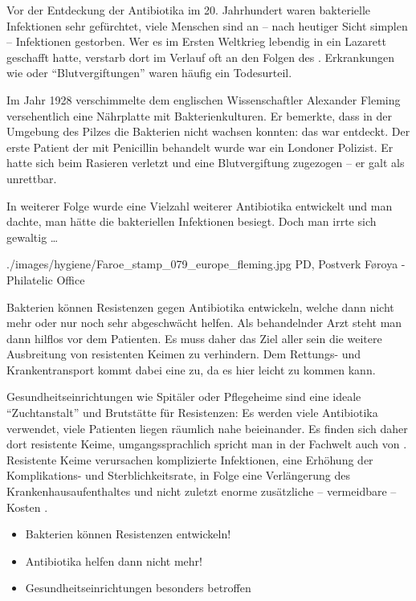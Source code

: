 {%
Vor der Entdeckung der Antibiotika im 20. Jahrhundert waren
bakterielle Infektionen sehr gefürchtet, viele Menschen sind
an -- nach heutiger Sicht simplen -- Infektionen gestorben.
Wer es im Ersten Weltkrieg lebendig in ein Lazarett geschafft
hatte, verstarb dort im Verlauf  oft an den Folgen des
. Erkrankungen wie  oder
\enquote{Blutvergiftungen} waren häufig ein Todesurteil.

Im Jahr 1928 verschimmelte dem englischen Wissenschaftler
Alexander Fleming versehentlich eine Nährplatte mit
Bakterienkulturen. Er bemerkte, dass in der Umgebung des
Pilzes die Bakterien nicht wachsen konnten: das
 war entdeckt. Der erste Patient der mit
Penicillin behandelt wurde war ein Londoner Polizist. Er
hatte sich beim Rasieren verletzt und eine Blutvergiftung
zugezogen -- er galt als unrettbar.~

In weiterer Folge wurde eine Vielzahl weiterer Antibiotika
entwickelt und man dachte, man hätte die bakteriellen
Infektionen besiegt. Doch man irrte sich gewaltig {\ldots}
}
{}
{./images/hygiene/Faroe_stamp_079_europe_fleming.jpg}
{}
{PD, Postverk Føroya -
Philatelic Office}



{%
Bakterien können Resistenzen gegen Antibiotika entwickeln,
welche dann nicht mehr oder nur noch sehr abgeschwächt
helfen. Als behandelnder Arzt steht man dann hilflos vor dem
Patienten.
Es muss daher das Ziel aller sein die weitere Ausbreitung von
resistenten Keimen zu verhindern. Dem Rettungs- und
Krankentransport kommt dabei eine  zu, da
es hier leicht zu  kommen kann.

Gesundheitseinrichtungen wie Spitäler oder Pflegeheime sind
eine ideale \enquote{Zuchtanstalt} und Brutstätte für Resistenzen:
Es werden viele Antibiotika verwendet, viele Patienten liegen
räumlich nahe beieinander. Es finden sich daher dort
 resistente Keime, umgangssprachlich spricht man
in der Fachwelt auch von
.
Resistente Keime verursachen komplizierte Infektionen, eine
Erhöhung der Komplikations- und Sterblichkeitsrate, in Folge
eine Verlängerung des Krankenhausaufenthaltes und nicht
zuletzt enorme zusätzliche -- vermeidbare -- Kosten
\cite{Kucera2010}.
}{
\begin{itemize}
   \item Bakterien können Resistenzen entwickeln!
   \item Antibiotika helfen dann nicht mehr!
   \item Gesundheitseinrichtungen besonders betroffen
\end{itemize}
}
{}
{}
{}

